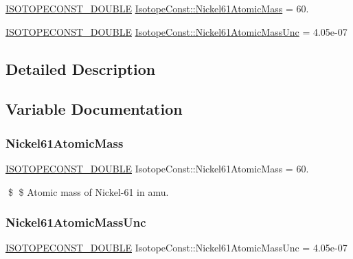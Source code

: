 \begin{DoxyCompactItemize}
\item 
\mbox{\hyperlink{group___isotope_const-_macros_ga8f45a7272ce02c0b4c65c44636ed719a}{I\+S\+O\+T\+O\+P\+E\+C\+O\+N\+S\+T\+\_\+\+D\+O\+U\+B\+LE}} \mbox{\hyperlink{group___isotope_const-_nickel-_ni61_gaae90c819ce423ebdae74f46180ee4598}{Isotope\+Const\+::\+Nickel61\+Atomic\+Mass}} = 60.
\item 
\mbox{\hyperlink{group___isotope_const-_macros_ga8f45a7272ce02c0b4c65c44636ed719a}{I\+S\+O\+T\+O\+P\+E\+C\+O\+N\+S\+T\+\_\+\+D\+O\+U\+B\+LE}} \mbox{\hyperlink{group___isotope_const-_nickel-_ni61_ga2c0370762701ae4f923412d168290fad}{Isotope\+Const\+::\+Nickel61\+Atomic\+Mass\+Unc}} = 4.\+05e-\/07
\end{DoxyCompactItemize}


\subsection{Detailed Description}


\subsection{Variable Documentation}
\mbox{\label{group___isotope_const-_nickel-_ni61_gaae90c819ce423ebdae74f46180ee4598}} 
\subsubsection{\texorpdfstring{Nickel61\+Atomic\+Mass}{Nickel61AtomicMass}}
{\footnotesize\ttfamily \mbox{\hyperlink{group___isotope_const-_macros_ga8f45a7272ce02c0b4c65c44636ed719a}{I\+S\+O\+T\+O\+P\+E\+C\+O\+N\+S\+T\+\_\+\+D\+O\+U\+B\+LE}} Isotope\+Const\+::\+Nickel61\+Atomic\+Mass = 60.}

\$ \$ Atomic mass of Nickel-\/61 in amu. \mbox{\label{group___isotope_const-_nickel-_ni61_ga2c0370762701ae4f923412d168290fad}} 
\subsubsection{\texorpdfstring{Nickel61\+Atomic\+Mass\+Unc}{Nickel61AtomicMassUnc}}
{\footnotesize\ttfamily \mbox{\hyperlink{group___isotope_const-_macros_ga8f45a7272ce02c0b4c65c44636ed719a}{I\+S\+O\+T\+O\+P\+E\+C\+O\+N\+S\+T\+\_\+\+D\+O\+U\+B\+LE}} Isotope\+Const\+::\+Nickel61\+Atomic\+Mass\+Unc = 4.\+05e-\/07}

